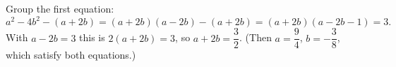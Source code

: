 Group the first equation:
\[
a^2-4b^2-(a+2b)=(a+2b)(a-2b)-(a+2b)=(a+2b)(a-2b-1)=3 .
\]
With $a-2b=3$ this is $2(a+2b)=3$, so $a+2b=\boxed{\dfrac{3}{2}}$. (Then $a=\dfrac{9}{4}$, $b=-\dfrac{3}{8}$, which satisfy both equations.)
